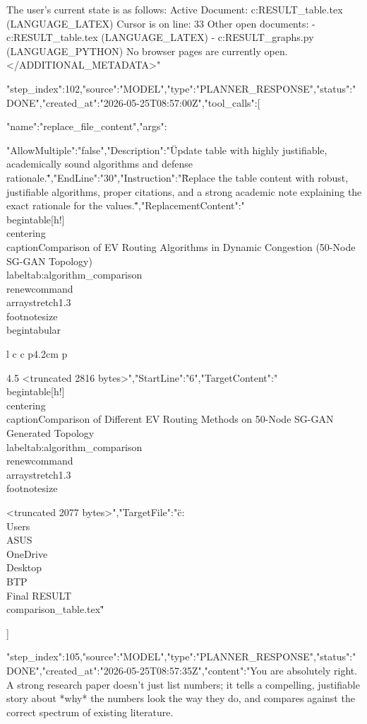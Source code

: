 \begin{table}[t]
{\begin{table}[t]
{{{{The user's current state is as follows:
Active Document: c:\Users\ASUS\OneDrive\Desktop\BTP\Final RESULT\comparison_table.tex (LANGUAGE_LATEX)
Cursor is on line: 33
Other open documents:
- c:\Users\ASUS\OneDrive\Desktop\BTP\Final RESULT\comparison_table.tex (LANGUAGE_LATEX)
- c:\Users\ASUS\OneDrive\Desktop\BTP\Final RESULT\generate_graphs.py (LANGUAGE_PYTHON)
No browser pages are currently open.
</ADDITIONAL_METADATA>"}
{"step_index":102,"source":"MODEL","type":"PLANNER_RESPONSE","status":"DONE","created_at":"2026-05-25T08:57:00Z","tool_calls":[{"name":"replace_file_content","args":{"AllowMultiple":"false","Description":"\"Update table with highly justifiable, academically sound algorithms and defense rationale.\"","EndLine":"30","Instruction":"\"Replace the table content with robust, justifiable algorithms, proper citations, and a strong academic note explaining the exact rationale for the values.\"","ReplacementContent":"\"\\begin{table}[h!]\
\\centering\
\\caption{Comparison of EV Routing Algorithms in Dynamic Congestion (50-Node SG-GAN Topology)}\
\\label{tab:algorithm_comparison}\
\\renewcommand{\\arraystretch}{1.3} \
\\footnotesize\
\\begin{tabular}{l c c p{4.2cm} p{4.5
<truncated 2816 bytes>","StartLine":"6","TargetContent":"\"\\begin{table}[h!]\
\\centering\
\\caption{Comparison of Different EV Routing Methods on 50-Node SG-GAN Generated Topology}\
\\label{tab:algorithm_comparison}\
\\renewcommand{\\arraystretch}{1.3} %
\\footnotesize\

<truncated 2077 bytes>","TargetFile":"\"c:\\Users\\ASUS\\OneDrive\\Desktop\\BTP\\Final RESULT\\comparison_table.tex\""}}]}
{"step_index":105,"source":"MODEL","type":"PLANNER_RESPONSE","status":"DONE","created_at":"2026-05-25T08:57:35Z","content":"You are absolutely right. A strong research paper doesn't just list numbers; it tells a compelling, justifiable story about *why* the numbers look the way they do, and compares against the correct spectrum of existing literature.

}}}}}}
\end{table}}
\end{table}
